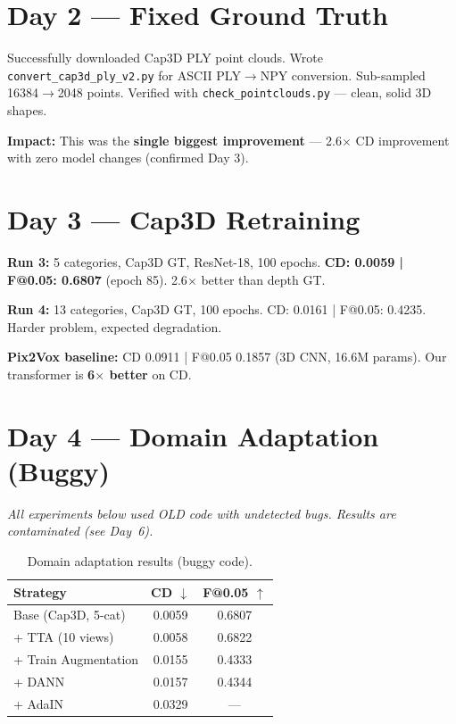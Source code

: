 \documentclass[10pt,twocolumn,letterpaper]{article}
\begin{document}
\section{Day 2 --- Fixed Ground Truth}

Successfully downloaded Cap3D PLY point clouds. Wrote \texttt{convert\_cap3d\_ply\_v2.py} for ASCII PLY$\to$NPY conversion. Sub-sampled 16384$\to$2048 points. Verified with \texttt{check\_pointclouds.py} --- clean, solid 3D shapes.

\textbf{Impact:} This was the \textbf{single biggest improvement} --- 2.6$\times$ CD improvement with zero model changes (confirmed Day 3).

\section{Day 3 --- Cap3D Retraining}

\textbf{Run 3:} 5 categories, Cap3D GT, ResNet-18, 100 epochs.
\textbf{CD: 0.0059 | F@0.05: 0.6807} (epoch 85). 2.6$\times$ better than depth GT.

\textbf{Run 4:} 13 categories, Cap3D GT, 100 epochs.
CD: 0.0161 | F@0.05: 0.4235. Harder problem, expected degradation.

\textbf{Pix2Vox baseline:} CD 0.0911 | F@0.05 0.1857 (3D CNN, 16.6M params). Our transformer is \textbf{6$\times$ better} on CD.

\section{Day 4 --- Domain Adaptation (Buggy)}

\textit{All experiments below used OLD code with undetected bugs. Results are contaminated (see Day~6).}

\begin{table}[h]
\centering
\scriptsize
\begin{tabular}{@{}lcc@{}}
\toprule
\textbf{Strategy} & \textbf{CD $\downarrow$} & \textbf{F@0.05 $\uparrow$} \\
\midrule
Base (Cap3D, 5-cat) & 0.0059 & 0.6807 \\
+ TTA (10 views) & 0.0058 & 0.6822 \\
+ Train Augmentation & 0.0155 & 0.4333 \\
+ DANN & 0.0157 & 0.4344 \\
+ AdaIN & 0.0329 & --- \\
\bottomrule
\end{tabular}
\caption{Domain adaptation results (buggy code).}
\end{table}
\end{document}
